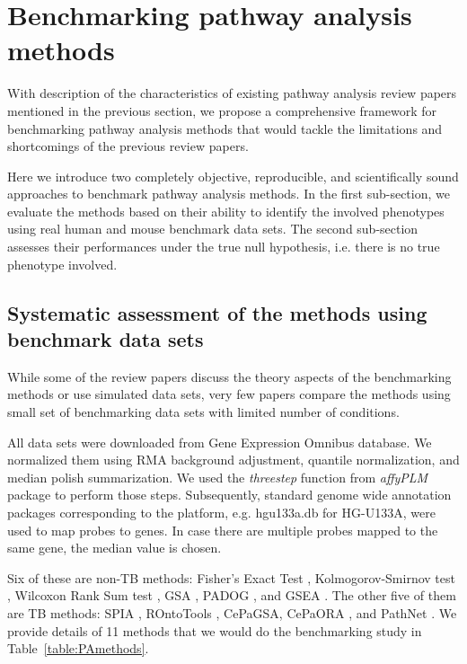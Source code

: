 \section{Benchmarking pathway analysis methods}

With description of the characteristics of existing pathway analysis review papers mentioned in the previous section, we propose a comprehensive framework for benchmarking pathway analysis methods that would tackle the limitations and shortcomings of the previous review papers.

Here we introduce two completely objective, reproducible, and scientifically sound approaches to benchmark pathway analysis methods. In the first sub-section, we evaluate the methods based on their ability to identify the involved phenotypes using real human and mouse benchmark data sets. The second sub-section assesses their performances under the true null hypothesis, i.e. there is no true phenotype involved.

\subsection{Systematic assessment of the methods using benchmark data sets}

While some of the review papers discuss the theory aspects of the benchmarking methods or use simulated data sets, very few papers compare the methods using small set of benchmarking data sets with limited number of conditions. 

All   data sets were downloaded from Gene Expression Omnibus database. We normalized them using RMA background adjustment, quantile normalization, and median polish summarization.  We used the \textit{threestep} function from \textit{affyPLM} package to perform those steps. Subsequently, standard genome wide annotation packages corresponding to the platform, e.g. hgu133a.db for HG-U133A, were used to map probes to genes. In case there are multiple probes mapped to the same gene, the median value is chosen.

Six of these are non-TB methods: Fisher's Exact Test \cite{Fisher:1951}, Kolmogorov-Smirnov test \cite{massey1951kolmogorov}, Wilcoxon Rank Sum test \cite{wilcoxon1945individual}, GSA \cite{Efron:2007}, PADOG \cite{Tarca2012down}, and GSEA \cite{Subramanian:2005}. The other five of them are TB methods: SPIA \cite{SPIAversion2.14.0}, ROntoTools \cite{RontoToolsVersion1.2.0}, CePaGSA, CePaORA \cite{gu2012centrality, gu2013cepa}, and PathNet \cite{Dutta:2012}. We provide details of 11 methods that we would do the benchmarking study in Table~\ref{table:PAmethods}. 

